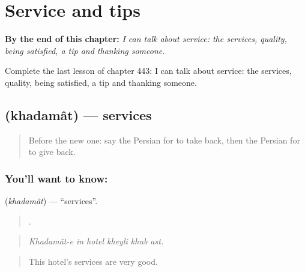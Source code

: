 
\chapter{Service and tips}
\label{ch:fa-service-and-tips}

\begin{chapteropening}
\textbf{By the end of this chapter:} \emph{I can talk about service: the services, quality, being satisfied, a tip and thanking someone.}

Complete the last lesson of chapter 443: I can talk about service: the services, quality, being satisfied, a tip and thanking someone.
\end{chapteropening}

\section[\texorpdfstring{\fa{خدمات} (khadamât)}{خدمات (khadamât)}]{ (khadamât) — services}

\label{lesson:FA-C443-khadamat}



\begin{quote}
Before the new one: say the Persian for to take back, then the Persian for to give back.
\end{quote}

\subsection*{You'll want to know: }
\textbf{} (\emph{khadamât}) — \textquotedblleft{}services\textquotedblright{}.

\begin{quote}
     .
\end{quote}

\begin{quote}
\emph{Khadamât-e in hotel kheyli khub ast.}
\end{quote}

\begin{quote}
This hotel's services are very good.
\end{quote}

